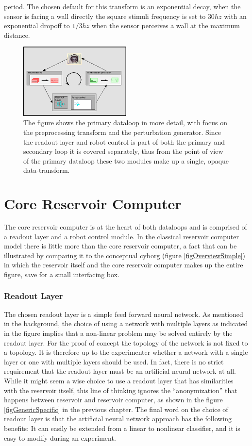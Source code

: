 period.
The chosen default for this transform is an exponential decay, when the sensor
is facing a wall directly the square stimuli frequency is set to $30hz$ with an
exponential dropoff to $1/3hz$ when the sensor perceives a wall at the maximum
distance.
\begin{figure}[h!]
  \centering
  \includegraphics[width=0.5\textwidth]{fig/rcLoop.png}
  \caption[Overview of primary dataloop]{
    The figure shows the primary dataloop in more detail, with focus on the
    preprocessing transform and the perturbation generator.
    Since the readout layer and robot control is part of both the primary and
    secondary loop it is covered separately, thus from the point of view of the
    primary dataloop these two modules make up a single, opaque data-transform.
  }
  \label{figDataLoop}
\end{figure}
%
\section{Core Reservoir Computer}
The core reservoir computer is at the heart of both dataloops and is
comprised of a readout layer and a robot control module.
In the classical reservoir computer model there is little more than the core
reservoir computer, a fact that can be illustrated by comparing it to the
conceptual cyborg (figure \ref{figOverviewSimple}) in which the reservoir itself and the
core reservoir computer makes up the entire figure, save for a small interfacing box.
\subsubsection{Readout Layer}
The chosen readout layer is a simple feed forward neural network.
As mentioned in the background, the choice of using a network with multiple
layers as indicated in the figure implies that a non-linear problem may be solved
entirely by the readout layer.
For the proof of concept the topology of the network is not fixed to a topology.
It is therefore up to the experimenter whether a network with a single layer or one
with multiple layers should be used.
In fact, there is no strict requirement that the readout layer must be an
artificial neural network at all.
While it might seem a wise choice to use a readout layer that has similarities
with the reservoir itself, this line of thinking ignores the ``anonymization''
that happens between reservoir and reservoir computer, as shown in the figure
\ref{figGenericSpecific} in the previous chapter.
The final word on the choice of readout layer is that the artificial neural
network approach has the following benefits:
It can easily be extended from a linear to nonlinear classifier, and it is easy
to modify during an experiment.
